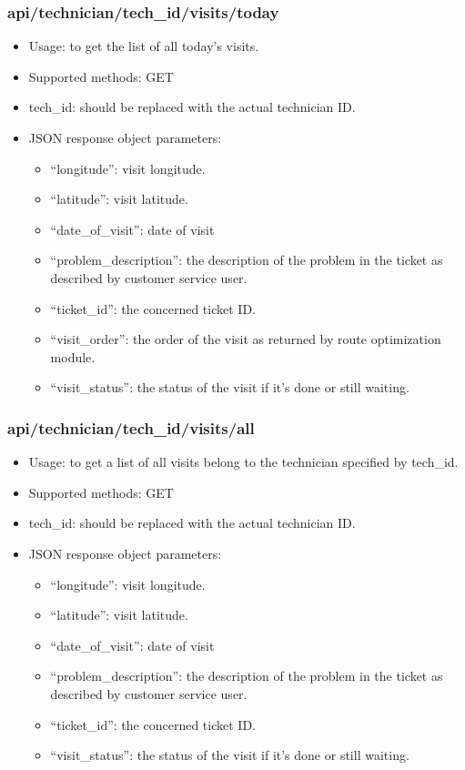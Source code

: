 	\subsubsection{api/technician/tech\_id/visits/today}
		\begin{itemize}
			\item Usage: to get the list of all today's visits.
			\item Supported methods: GET
			\item tech\_id: should be replaced with the actual technician ID.
			\item JSON response object parameters: \begin{itemize}
				\item ``longitude'': visit longitude.
				\item ``latitude'': visit latitude.
				\item ``date\_of\_visit'': date of visit
				\item ``problem\_description'': the description of the problem in the ticket as described by customer service user.
				\item ``ticket\_id'': the concerned ticket ID.
				\item ``visit\_order'': the order of the visit as returned by route optimization module.
				\item ``visit\_status'': the status of the visit if it's done or still waiting.
			\end{itemize}
		\end{itemize}
	\subsubsection{api/technician/tech\_id/visits/all}
		\begin{itemize}
			\item Usage: to get a list of all visits belong to the technician specified by tech\_id.
			\item Supported methods: GET
			\item tech\_id: should be replaced with the actual technician ID.
			\item JSON response object parameters: \begin{itemize}
				\item ``longitude'': visit longitude.
				\item ``latitude'': visit latitude.
				\item ``date\_of\_visit'': date of visit
				\item ``problem\_description'': the description of the problem in the ticket as described by customer service user.
				\item ``ticket\_id'': the concerned ticket ID.
				\item ``visit\_status'': the status of the visit if it's done or still waiting.
			\end{itemize}
		\end{itemize}

